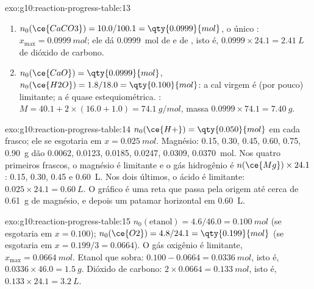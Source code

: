 \begin{solution}{exo:g10:reaction-progress-table:13}
\begin{enumerate}
  \item $n_0(\ce{CaCO3}) = 10.0 / 100.1 = \qty{0.0999}{mol}$, o único
        : $x_{\max} = \qty{0.0999}{mol}$; ele dá
        \qty{0.0999}{mol} de  e de , isto é,
        $0.0999 \times 24.1 = \qty{2.41}{L}$ de dióxido de carbono.
  \item $n_0(\ce{CaO}) = \qty{0.0999}{mol}$, $n_0(\ce{H2O}) = 1.8 / 18.0
        = \qty{0.100}{mol}$: a cal virgem é (por pouco) limitante; a
         é quase estequiométrica. :
        $M = 40.1 + 2 \times (16.0 + 1.0) = \qty{74.1}{g/mol}$, massa
        $0.0999 \times 74.1 = \qty{7.40}{g}$.
\end{enumerate}
\end{solution}

\begin{solution}{exo:g10:reaction-progress-table:14}
$n_0(\ce{H+}) = \qty{0.050}{mol}$ em cada frasco; ele se esgotaria em
$x = \qty{0.025}{mol}$. Magnésio: 0.15, 0.30, 0.45, 0.60, 0.75,
\qty{0.90}{g} dão 0.0062, 0.0123, 0.0185, 0.0247, 0.0309,
\qty{0.0370}{mol}. Nos quatro primeiros frascos, o magnésio é limitante
e o gás hidrogênio é $n(\ce{Mg}) \times 24.1$: 0.15, 0.30, 0.45 e
\qty{0.60}{L}. Nos dois últimos, o ácido é limitante: $0.025 \times 24.1
= \qty{0.60}{L}$. O gráfico é uma reta que passa pela origem até cerca
de \qty{0.61}{g} de magnésio, e depois um patamar horizontal em
\qty{0.60}{L}.
\end{solution}

\begin{solution}{exo:g10:reaction-progress-table:15}
$n_0(\text{etanol}) = 4.6 / 46.0 = \qty{0.100}{mol}$ (se esgotaria em
$x = 0.100$); $n_0(\ce{O2}) = 4.8 / 24.1 = \qty{0.199}{mol}$ (se
esgotaria em $x = 0.199/3 = 0.0664$). O gás oxigênio é limitante,
$x_{\max} = \qty{0.0664}{mol}$. Etanol que sobra: $0.100 - 0.0664 =
\qty{0.0336}{mol}$, isto é, $0.0336 \times 46.0 = \qty{1.5}{g}$. Dióxido
de carbono: $2 \times 0.0664 = \qty{0.133}{mol}$, isto é,
$0.133 \times 24.1 = \qty{3.2}{L}$.
\end{solution}

